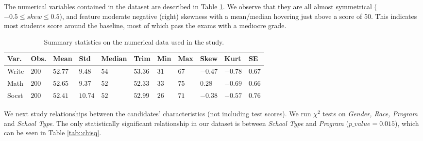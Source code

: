 \documentclass[10pt]{article}
\begin{document}
	
	The numerical variables contained in the dataset are described in Table \ref{tab::summary_stats}. We observe that they are all almost symmetrical ($-0.5 \leq skew \leq 0.5$), and feature moderate negative (right) skewness with a mean/median hovering just above a score of 50. This indicates most students score around the baseline, most of which pass the exams with a mediocre grade.
	
	\begin{table}
		\centering
		\begin{tabular}
			{ |p{1cm} p{0.5cm} p{0.7cm} p{0.5cm} p{1cm} p{0.7cm} p{0.5cm} p{0.5cm} p{0.5cm} p{0.5cm} p{0.5cm}| }
			\hline
			\textbf{Var.} & \textbf{Obs.} & \textbf{Mean} & \textbf{Std} & \textbf{Median} & \textbf{Trim} & \textbf{Min} & \textbf{Max} & \textbf{Skew} & \textbf{Kurt} & \textbf{SE}\\
			\hline
			Write & $200$ & $52.77$ & $9.48$ & $54$ & $53.36$ & $31$ & $67$ & $-0.47$ & $-0.78$ & $0.67$ \\
			Math & $200$ & $52.65$ & $9.37$ & $52$ & $52.33$ & $33$ & $75$ & $0.28$ & $-0.69$ & $0.66$ \\
			Socst & $200$ & $52.41$ & $10.74$ & $52$ &$ 52.99$ & $26$ & $71$ & $-0.38$ & $-0.57$ & $0.76$ \\
			\hline
		\end{tabular}
		\caption{Summary statistics on the numerical data used in the study.}
		\label{tab::summary_stats}
	\end{table}
	
	We next study relationships between the candidates' characteristics (not including test scores). We run $\chi^2$ tests on \textit{Gender, Race, Program} and \textit{School Type}. The only statistically significant relationship in our dataset is between \textit{School Type} and \textit{Program} ($p\_value = 0.015$), which can be seen in Table \ref{tab::chisq}.
	
\end{document}
